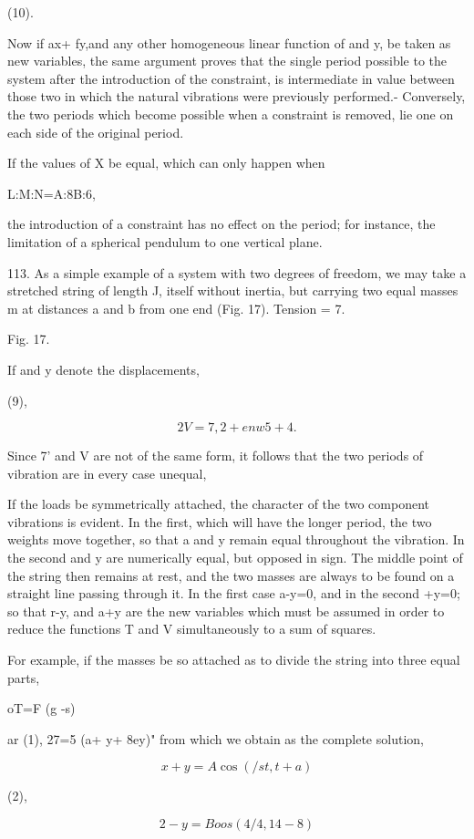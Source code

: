 (10).

Now if ax+ fy,and any other homogeneous linear function of and y, be taken as
new variables, the same argument proves that the single period possible to the
system after the introduction of the constraint, is intermediate in value
between those two in which the natural vibrations were previously performed.-
Conversely, the two periods which become possible when a constraint is removed,
lie one on each side of the original period.

If the values of X be equal, which can only happen when

L:M:N=A:8B:6,

the introduction of a constraint has no effect on the period; for instance, the
limitation of a spherical pendulum to one vertical plane.

113. As a simple example of a system with two degrees of freedom, we may take a
stretched string of length J, itself without inertia, but carrying two equal
masses m at distances a and b from one end (Fig. 17).  Tension = 7.

Fig. 17.

If and y denote the displacements,

(9),

\[2V= 7, {2+ enw 5 +4}.\]

Since 7' and V are not of the same form, it follows that the two periods of
vibration are in every case unequal,

If the loads be symmetrically attached, the character of the two component
vibrations is evident. In the first, which will have the longer period, the two
weights move together, so that a and y remain equal throughout the vibration.
In the second and y are numerically equal, but opposed in sign. The middle
point of the string then remains at rest, and the two masses are always to be
found on a straight line passing through it. In the first case a-y=0, and in
the second +y=0; so that r-y, and a+y are the new variables which must be
assumed in order to reduce the functions T and V simultaneously to a sum of
squares.

For example, if the masses be so attached as to divide the string into three
equal parts,

oT=F (g -s)

ar (1), 27=5 (a+ y+ 8ey)" from which we obtain as the complete solution,

\[x+y=A \cos(/ st, t+a)\]

(2),

\[2-y= Boos (4/4, 14-8)\]

